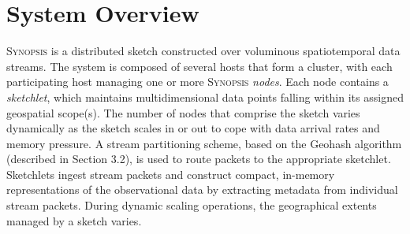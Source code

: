 \section{System Overview}
\label{sec:system}
\textsc{Synopsis} is a distributed sketch constructed over voluminous spatiotemporal data streams.
The system is composed of several hosts that form a cluster, with each participating host managing one or more \textsc{Synopsis} \emph{nodes}.
Each node contains a \emph{sketchlet}, which maintains multidimensional data points falling within its assigned geospatial scope(s).
The number of nodes that comprise the sketch varies dynamically as the sketch scales in or out to cope with data arrival rates and memory pressure.
A stream partitioning scheme, based on the Geohash algorithm (described in Section 3.2), is used to route packets to the appropriate sketchlet.
Sketchlets ingest stream packets and construct compact, in-memory representations of the observational data by extracting metadata from individual stream packets.
During dynamic scaling operations, the geographical extents managed by a sketch varies.

